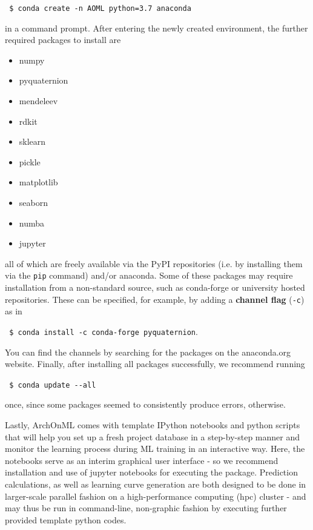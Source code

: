 \documentclass[12pt]{achemso}
\begin{document}
\verb+ $ conda create -n AOML python=3.7 anaconda+

\noindent in a command prompt. After entering the newly created environment, the further required packages to install are\\[-2.5em]

\begin{itemize}
    \item numpy \\[-3.5em]
    \item pyquaternion \\[-3.5em]
    \item mendeleev \\[-3.5em]
    \item rdkit \\[-3.5em]
    \item sklearn \\[-3.5em]
    \item pickle \\[-3.5em]
    \item matplotlib\\[-3.5em]
    \item seaborn\\[-3.5em]
    \item numba\\[-3.5em]
    \item jupyter
\end{itemize}

\noindent all of which are freely available via the PyPI repositories (i.e. by installing them via the \verb+pip+ command) and/or anaconda. Some of these packages may require installation from a non-standard source, such as conda-forge or university hosted repositories. These can be specified, for example, by adding a \textbf{channel flag} (\verb+-c+) as in

\verb+ $ conda install -c conda-forge pyquaternion+.

\noindent You can find the channels by searching for the packages on the anaconda.org website. Finally, after installing all packages successfully, we recommend running

\verb+ $ conda update --all+

\noindent once, since some packages seemed to consistently produce errors, otherwise.

\noindent Lastly, ArchOnML comes with template IPython notebooks and python scripts that will help you set up a fresh project database in a step-by-step manner and monitor the learning process during ML training in an interactive way. Here, the notebooks serve as an interim graphical user interface - so we recommend installation and use of jupyter notebooks for executing the package. Prediction calculations, as well as learning curve generation are both designed to be done in larger-scale parallel fashion on a high-performance computing (hpc) cluster - and may thus be run in command-line, non-graphic fashion by executing further provided template python codes.
\end{document}

